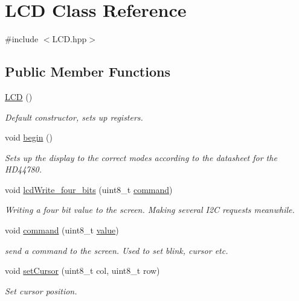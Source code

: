 \hypertarget{class_l_c_d}{}\section{L\+CD Class Reference}
\label{class_l_c_d}


{\ttfamily \#include $<$L\+C\+D.\+hpp$>$}

\subsection*{Public Member Functions}
\begin{DoxyCompactItemize}
\item 
\hyperlink{class_l_c_d_a00bb2db1390721abc7b24ac4b8c276c8}{L\+CD} ()
\begin{DoxyCompactList}\small\item\em Default constructor, sets up registers. \end{DoxyCompactList}\item 
void \hyperlink{class_l_c_d_aa8f5c322edfcbbd78c719a8a9d6f1600}{begin} ()
\begin{DoxyCompactList}\small\item\em Sets up the display to the correct modes according to the datasheet for the H\+D44780. \end{DoxyCompactList}\item 
void \hyperlink{class_l_c_d_a3936d094c35e80038c68c94d1acee71d}{lcd\+Write\+\_\+four\+\_\+bits} (uint8\+\_\+t \hyperlink{class_l_c_d_a31a0cb42497d83cdc9cb8000828f7190}{command})
\begin{DoxyCompactList}\small\item\em Writing a four bit value to the screen. Making several I2C requests meanwhile. \end{DoxyCompactList}\item 
void \hyperlink{class_l_c_d_a31a0cb42497d83cdc9cb8000828f7190}{command} (uint8\+\_\+t \hyperlink{button__drv_8c_ac4f474c82e82cbb89ca7c36dd52be0ed}{value})
\begin{DoxyCompactList}\small\item\em send a command to the screen. Used to set blink, cursor etc. \end{DoxyCompactList}\item 
void \hyperlink{class_l_c_d_a48220450fd152b25994eb7d0ba340e8d}{set\+Cursor} (uint8\+\_\+t col, uint8\+\_\+t row)
\begin{DoxyCompactList}\small\item\em Set cursor position. \end{DoxyCompactList}\item 

\end{DoxyCompactItemize}
